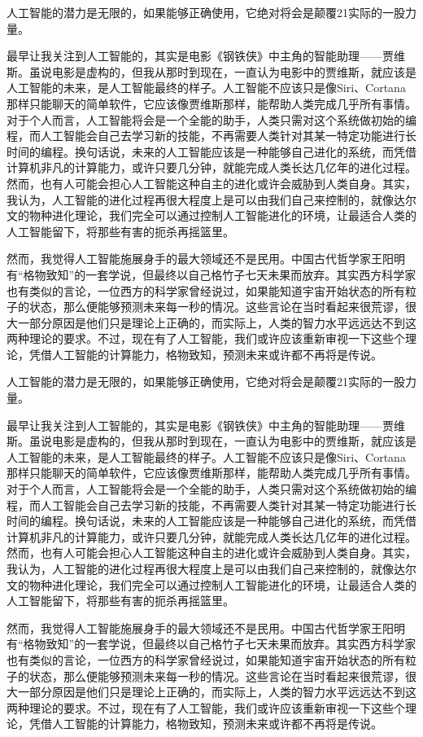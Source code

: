 \documentclass[UTF8]{XJTUthesis}
\begin{document}
人工智能的潜力是无限的，如果能够正确使用，它绝对将会是颠覆21实际的一股力量。\par
最早让我关注到人工智能的，其实是电影《钢铁侠》中主角的智能助理——贾维斯。虽说电影是虚构的，但我从那时到现在，一直认为电影中的贾维斯，就应该是人工智能的未来，是人工智能最终的样子。人工智能不应该只是像Siri、Cortana那样只能聊天的简单软件，它应该像贾维斯那样，能帮助人类完成几乎所有事情。对于个人而言，人工智能将会是一个全能的助手，人类只需对这个系统做初始的编程，而人工智能会自己去学习新的技能，不再需要人类针对其某一特定功能进行长时间的编程。换句话说，未来的人工智能应该是一种能够自己进化的系统，而凭借计算机非凡的计算能力，或许只要几分钟，就能完成人类长达几亿年的进化过程。然而，也有人可能会担心人工智能这种自主的进化或许会威胁到人类自身。其实，我认为，人工智能的进化过程再很大程度上是可以由我们自己来控制的，就像达尔文的物种进化理论，我们完全可以通过控制人工智能进化的环境，让最适合人类的人工智能留下，将那些有害的扼杀再摇篮里。\par
然而，我觉得人工智能施展身手的最大领域还不是民用。中国古代哲学家王阳明有“格物致知”的一套学说，但最终以自己格竹子七天未果而放弃。其实西方科学家也有类似的言论，一位西方的科学家曾经说过，如果能知道宇宙开始状态的所有粒子的状态，那么便能够预测未来每一秒的情况。这些言论在当时看起来很荒谬，很大一部分原因是他们只是理论上正确的，而实际上，人类的智力水平远远达不到这两种理论的要求。不过，现在有了人工智能，我们或许应该重新审视一下这些个理论，凭借人工智能的计算能力，格物致知，预测未来或许都不再将是传说。\par
人工智能的潜力是无限的，如果能够正确使用，它绝对将会是颠覆21实际的一股力量。\par
最早让我关注到人工智能的，其实是电影《钢铁侠》中主角的智能助理——贾维斯。虽说电影是虚构的，但我从那时到现在，一直认为电影中的贾维斯，就应该是人工智能的未来，是人工智能最终的样子。人工智能不应该只是像Siri、Cortana那样只能聊天的简单软件，它应该像贾维斯那样，能帮助人类完成几乎所有事情。对于个人而言，人工智能将会是一个全能的助手，人类只需对这个系统做初始的编程，而人工智能会自己去学习新的技能，不再需要人类针对其某一特定功能进行长时间的编程。换句话说，未来的人工智能应该是一种能够自己进化的系统，而凭借计算机非凡的计算能力，或许只要几分钟，就能完成人类长达几亿年的进化过程。然而，也有人可能会担心人工智能这种自主的进化或许会威胁到人类自身。其实，我认为，人工智能的进化过程再很大程度上是可以由我们自己来控制的，就像达尔文的物种进化理论，我们完全可以通过控制人工智能进化的环境，让最适合人类的人工智能留下，将那些有害的扼杀再摇篮里。\par
然而，我觉得人工智能施展身手的最大领域还不是民用。中国古代哲学家王阳明有“格物致知”的一套学说，但最终以自己格竹子七天未果而放弃。其实西方科学家也有类似的言论，一位西方的科学家曾经说过，如果能知道宇宙开始状态的所有粒子的状态，那么便能够预测未来每一秒的情况。这些言论在当时看起来很荒谬，很大一部分原因是他们只是理论上正确的，而实际上，人类的智力水平远远达不到这两种理论的要求。不过，现在有了人工智能，我们或许应该重新审视一下这些个理论，凭借人工智能的计算能力，格物致知，预测未来或许都不再将是传说。\par
\end{document}
